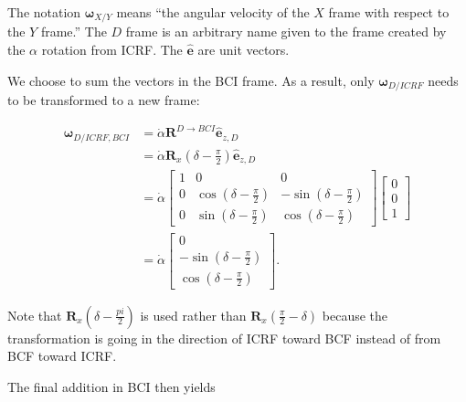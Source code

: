 \documentclass[]{article}
\newcommand{\vb}[1]{\bm{#1}} %
\newcommand{\vbh}[1]{\hat{\bm{#1}}} %
\begin{document}
\noindent The notation $\vb{\omega}_{X/Y}$ means ``the angular velocity of the $X$ frame with respect to the $Y$ frame.'' The $D$ frame is an arbitrary name given to the frame created by the $\alpha$ rotation from ICRF. The $\vbh{e}$ are unit vectors.

We choose to sum the vectors in the BCI frame. As a result, only $\vb{\omega}_{D/ICRF}$ needs to be transformed to a new frame:

\begin{align}
	\vb{\omega}_{D/ICRF, BCI} &= \dot{\alpha} \vb{R}^{D \rightarrow BCI} \vbh{e}_{z, D} \\
	&= \dot{\alpha} \vb{R}_x \left( \delta - \frac{\pi}{2} \right) \vbh{e}_{z, D} \\
	&=
	\dot{\alpha} \left[ \begin{array}{ccc}
	1 & 0 & 0 \\
	0 & \cos \left( \delta - \frac{\pi}{2} \right) & -\sin \left( \delta - \frac{\pi}{2} \right) \\
	0 & \sin \left( \delta - \frac{\pi}{2} \right) & \cos \left( \delta - \frac{\pi}{2} \right)
	\end{array} \right]
	\left[ \begin{array}{c}
	0 \\
	0 \\
	1 \end{array} \right] \\
	&=
	\dot{\alpha} \left[ \begin{array}{c}
	0 \\
	-\sin \left( \delta - \frac{\pi}{2} \right) \\
	\cos \left( \delta - \frac{\pi}{2} \right) \end{array} \right].
\end{align}

\noindent Note that $\vb{R}_x \left( \delta - \frac{pi}{2} \right)$ is used rather than $\vb{R}_x \left(\frac{\pi}{2} - \delta \right)$ because the transformation is going in the direction of ICRF toward BCF instead of from BCF toward ICRF.

The final addition in BCI then yields
\end{document}
